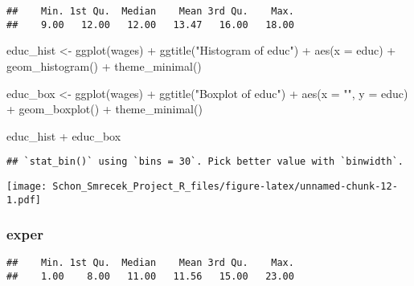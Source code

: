 \documentclass[
]{article}
\newenvironment{Shaded}{\begin{snugshade}}{\end{snugshade}}
\newcommand{\AttributeTok}[1]{\textcolor[rgb]{0.77,0.63,0.00}{#1}}
\newcommand{\FunctionTok}[1]{\textcolor[rgb]{0.00,0.00,0.00}{#1}}
\newcommand{\NormalTok}[1]{#1}
\newcommand{\OtherTok}[1]{\textcolor[rgb]{0.56,0.35,0.01}{#1}}
\newcommand{\SpecialCharTok}[1]{\textcolor[rgb]{0.00,0.00,0.00}{#1}}
\newcommand{\StringTok}[1]{\textcolor[rgb]{0.31,0.60,0.02}{#1}}
\begin{document}
\begin{verbatim}
##    Min. 1st Qu.  Median    Mean 3rd Qu.    Max. 
##    9.00   12.00   12.00   13.47   16.00   18.00
\end{verbatim}

\begin{Shaded}
\begin{Highlighting}[]
\NormalTok{educ\_hist }\OtherTok{\textless{}{-}} \FunctionTok{ggplot}\NormalTok{(wages) }\SpecialCharTok{+} \FunctionTok{ggtitle}\NormalTok{(}\StringTok{"Histogram of educ"}\NormalTok{) }\SpecialCharTok{+} \FunctionTok{aes}\NormalTok{(}\AttributeTok{x =}\NormalTok{ educ) }\SpecialCharTok{+} \FunctionTok{geom\_histogram}\NormalTok{() }\SpecialCharTok{+} \FunctionTok{theme\_minimal}\NormalTok{()}

\NormalTok{educ\_box }\OtherTok{\textless{}{-}} \FunctionTok{ggplot}\NormalTok{(wages) }\SpecialCharTok{+} \FunctionTok{ggtitle}\NormalTok{(}\StringTok{"Boxplot of educ"}\NormalTok{) }\SpecialCharTok{+} \FunctionTok{aes}\NormalTok{(}\AttributeTok{x =} \StringTok{""}\NormalTok{, }\AttributeTok{y =}\NormalTok{ educ) }\SpecialCharTok{+} \FunctionTok{geom\_boxplot}\NormalTok{() }\SpecialCharTok{+} \FunctionTok{theme\_minimal}\NormalTok{()}

\NormalTok{educ\_hist }\SpecialCharTok{+}\NormalTok{ educ\_box}
\end{Highlighting}
\end{Shaded}

\begin{verbatim}
## `stat_bin()` using `bins = 30`. Pick better value with `binwidth`.
\end{verbatim}

\texttt{[image: Schon\_Smrecek\_Project\_R\_files/figure-latex/unnamed-chunk-12-1.pdf]}

\hypertarget{exper}{%
\subsubsection{exper}\label{exper}}

\begin{Shaded}
\end{Shaded}

\begin{verbatim}
##    Min. 1st Qu.  Median    Mean 3rd Qu.    Max. 
##    1.00    8.00   11.00   11.56   15.00   23.00
\end{verbatim}
\end{document}

